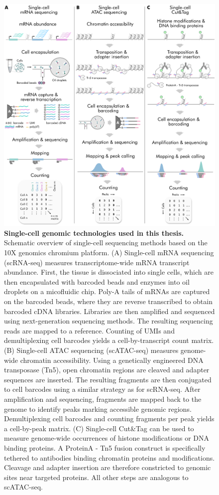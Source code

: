 \begin{figure}[H]
  \centering
  \includegraphics[width=\textwidth]{figures/introduction/Figure_tech}
  \caption{\textbf{Single-cell genomic technologies used in this thesis.} 
  Schematic overview of single-cell sequencing methods based on the 10X genomics chromium platform. (A) Single-cell mRNA sequencing (scRNA-seq) measures transcriptome-wide mRNA transcript abundance. First, the tissue is dissociated into single cells, which are then encapsulated with barcoded beads and enzymes into oil droplets on a micofluidic chip. Poly-A tails of mRNAs are captured on the barcoded beads, where they are reverse transcribed to obtain barcoded cDNA libraries. Libraries are then amplified and sequenced using next-generation sequencing methods. The resulting sequencing reads are mapped to a reference. Counting of UMIs and demultiplexing cell barcodes yields a cell-by-transcript count matrix. (B) Single-cell ATAC sequencing (scATAC-seq) measures genome-wide chromatin accessibility. Using a genetically engineered DNA transposase (Tn5), open chromatin regions are cleaved and adapter sequences are inserted. The resulting fragments are then conjugated to cell barcodes using a similar strategy as for scRNA-seq. After amplification and sequencing, fragments are mapped back to the genome to identify peaks marking accessible genomic regions. Demultiplexing cell barcodes and counting fragments per peak yields a cell-by-peak matrix. (C) Single-cell Cut\&Tag can be used to measure genome-wide occurrences of histone modifications or DNA binding proteins. A ProteinA - Tn5 fusion construct is specifically tethered to antibodies binding chromatin proteins and modifications. Cleavage and adapter insertion are therefore constricted to genomic sites near targeted proteins. All other steps are analogous to scATAC-seq.}
  \label{fig:intro2}
\end{figure}

